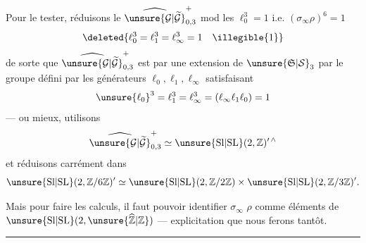 Pour le tester, réduisons le 
$\widehat{\unsure{\mathcal G|\widetilde{\mathcal G}}}_{0,3}^{+}$
mod les 
$\ell_0^3=1$ i.e. $(\sigma_\infty\rho)^6=1$
\[
\deleted{\ell_0^3=\ell_1^3=\ell_\infty^3=1\quad\illegible{1}}
\]
de sorte que $\widehat{\unsure{\mathcal G|\widetilde{\mathcal G}}}_{0,3}^{+}$
est  par une extension de $\unsure{\mathfrak S|\mathcal S}_3$
par le groupe défini par les générateurs $\ell_0,\ell_1,\ell_\infty$ satisfaisant
\[
\unsure{\ell_0}^3=\ell_1^3=\ell_\infty^3=(\ell_\infty\ell_1\ell_0)=1
\]
--- ou mieux, utilisons
\[
\widehat{\unsure{\mathcal G|\widetilde{\mathcal G}}}_{0,3}^{+}
\simeq\unsure{\mathrm{Sl}|\mathrm{SL}}(2,\mathbb Z)^{\prime\,\wedge}
\]
et réduisons carrément dans
\[
\unsure{\mathrm{Sl}|\mathrm{SL}}(2,\mathbb Z/6\mathbb Z)'
\simeq\unsure{\mathrm{Sl}|\mathrm{SL}}(2,\mathbb Z/2\mathbb Z)
\times\unsure{\mathrm{Sl}|\mathrm{SL}}(2,\mathbb Z/3\mathbb Z)'.
\]



Mais pour faire les calculs, il faut pouvoir identifier $\sigma_\infty$
 $\rho$ comme éléments de
$\unsure{\mathrm{Sl}|\mathrm{SL}}(2,\unsure{\widehat{\mathbb Z}|\mathbb Z})$
--- explicitation que nous ferons tantôt.

\begin{center}\rule{2cm}{0.4pt}\end{center}

